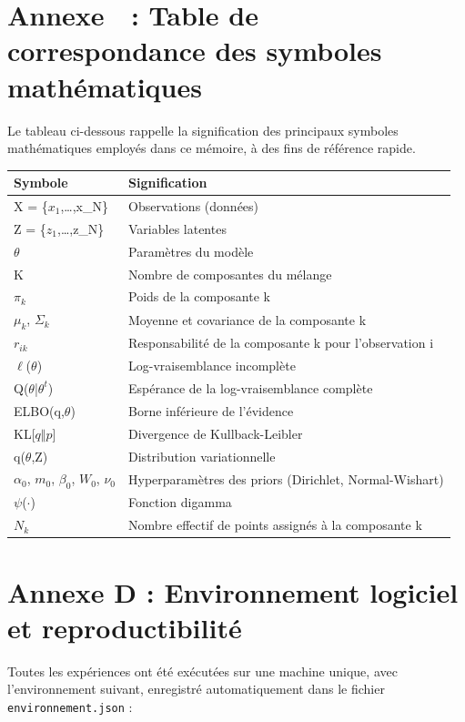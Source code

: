 \section*{Annexe  : Table de correspondance des symboles mathématiques}
Le tableau ci-dessous rappelle la signification des principaux symboles mathématiques employés dans ce mémoire, à des fins de référence rapide.

\begin{table}[H]
\centering
\small
\setlength{\tabcolsep}{0.14cm}
\begin{tabular}{|p{7.42cm}|p{7.42cm}|}
\hline
\textbf{Symbole} & \textbf{Signification} \\
\hline
X = \{$x_{1}$,\ldots{},x\_N\} & Observations (données) \\
\hline
Z = \{$z_{1}$,\ldots{},z\_N\} & Variables latentes \\
\hline
$\theta $ & Paramètres du modèle \\
\hline
K & Nombre de composantes du mélange \\
\hline
$\pi _{k}$ & Poids de la composante k \\
\hline
$\mu _{k}$, $\Sigma _{k}$ & Moyenne et covariance de la composante k \\
\hline
$r_{ik}$ & Responsabilité de la composante k pour l'observation i \\
\hline
$\ell $($\theta $) & Log-vraisemblance incomplète \\
\hline
Q($\theta $|$\theta ^{t}$) & Espérance de la log-vraisemblance complète \\
\hline
ELBO(q,$\theta $) & Borne inférieure de l'évidence \\
\hline
KL[$q\Vert p$] & Divergence de Kullback-Leibler \\
\hline
q($\theta $,Z) & Distribution variationnelle \\
\hline
$\alpha _{0}$, $m_{0}$, $\beta _{0}$, $W_{0}$, $\nu _{0}$ & Hyperparamètres des priors (Dirichlet, Normal-Wishart) \\
\hline
$\psi $($\cdot $) & Fonction digamma \\
\hline
$N_{k}$ & Nombre effectif de points assignés à la composante k \\
\hline
\end{tabular}
\end{table}
\section*{Annexe D : Environnement logiciel et reproductibilité}
Toutes les expériences ont été exécutées sur une machine unique, avec l'environnement suivant, enregistré automatiquement dans le fichier \texttt{environnement.json} :

